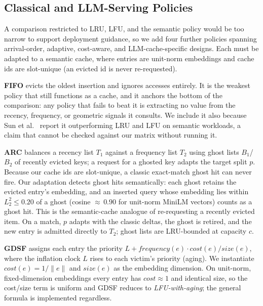 \documentclass[sigconf,nonacm]{acmart}
\begin{document}
\subsection{Classical and LLM-Serving Policies}
A comparison restricted to LRU, LFU, and the semantic policy would be too narrow to support deployment guidance, so we add four further policies spanning arrival-order, adaptive, cost-aware, and LLM-cache-specific designs. Each must be adapted to a semantic cache, where entries are unit-norm embeddings and cache ids are slot-unique (an evicted id is never re-requested).

\textbf{FIFO} evicts the oldest insertion and ignores accesses entirely. It is the weakest policy that still functions as a cache, and it anchors the bottom of the comparison: any policy that fails to beat it is extracting no value from the recency, frequency, or geometric signals it consults. We include it also because Sun et al.\ \cite{sun2026solar} report it outperforming LRU and LFU on semantic workloads, a claim that cannot be checked against our matrix without running it.

\textbf{ARC} \cite{megiddo2003arc} balances a recency list $T_1$ against a frequency list $T_2$ using ghost lists $B_1$/$B_2$ of recently evicted keys; a request for a ghosted key adapts the target split $p$. Because our cache ids are slot-unique, a classic exact-match ghost hit can never fire. Our adaptation detects ghost hits semantically: each ghost retains the evicted entry's embedding, and an inserted query whose embedding lies within
$L_2^2 \le 0.20$ of a ghost (cosine ${\approx}\,0.90$ for unit-norm MiniLM vectors) counts as a ghost hit. This is the semantic-cache analogue of re-requesting a recently evicted item. On a match, $p$ adapts with the classic deltas, the ghost is retired, and the new entry is admitted directly to $T_2$; ghost lists are LRU-bounded at capacity $c$.

\textbf{GDSF} \cite{cherkasova1998gdsf} assigns each entry the priority $L + \mathit{frequency}(e) \cdot \mathit{cost}(e)/\mathit{size}(e)$, where the inflation clock $L$ rises to each victim's priority (aging). We instantiate $\mathit{cost}(e) = 1/\lVert e \rVert$ and $\mathit{size}(e)$ as the embedding dimension. On unit-norm, fixed-dimension embeddings every entry has $\mathit{cost} \approx 1$ and identical size, so the cost/size term is uniform and GDSF reduces to \emph{LFU-with-aging}; the general formula is implemented regardless.
\end{document}
